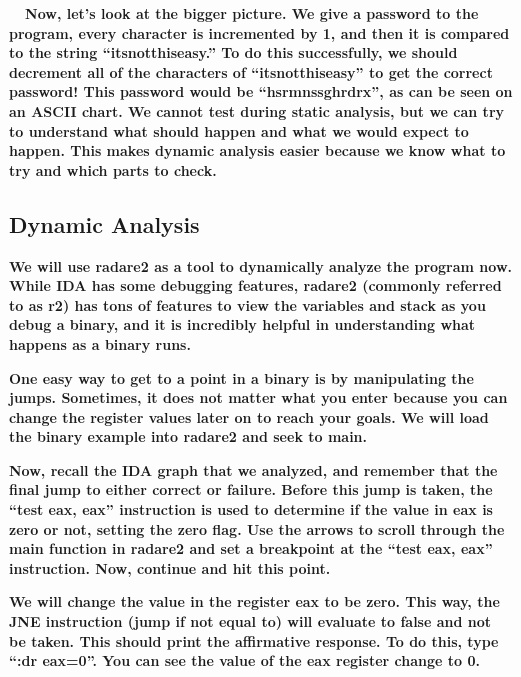 \documentclass[letterpaper]{article}
\newcommand{\sitfig}[3]{
\begin{figure}[H]
\centering
\makebox[\textwidth][c]{
#2
}
\label{#1}
\end{figure}
}
\newcommand{\sitgfx}[4][scale=1.0]{
\sitfig{#3}{\texttt{[image: \#2]}}{#4}
}
\begin{document}
\textbf{ \ \ Now, let's look at the bigger picture. We give a password to the program, every character is incremented by
1, and then it is compared to the string ``itsnotthiseasy.'' To do this successfully, we should decrement all of the
characters of ``itsnotthiseasy'' to get the correct password! This password would be
``hsrmnssghrd{\textasciigrave}rx'', as can be seen on an ASCII chart. We cannot test during static analysis, but we can
try to understand what should happen and what we would expect to happen. This makes dynamic analysis easier because we
know what to try and which parts to check.}

\subsection{Dynamic Analysis}

\textbf{We will use radare2 as a tool to dynamically analyze the program now. While IDA has some debugging features,
radare2 (commonly referred to as r2) has tons of features to view the variables and stack as you debug a binary, and it
is incredibly helpful in understanding what happens as a binary runs.}

\textbf{One easy way to get to a point in a binary is by manipulating the jumps. Sometimes, it does not matter what you
enter because you can change the register values later on to reach your goals. We will load the binary example into
radare2 and seek to main.}

  
\sitgfx[width=6.5in,height=4.0626in]{FINALWORKINGDOCFORMERLYPRECURSOR-img053.png}{fig:unk}{TODO CAPTION}
 \textbf{Now, recall the IDA graph that we analyzed, and remember that the final jump to either correct or failure.
Before this jump is taken, the ``test eax, eax'' instruction is used to determine if the value in eax is zero or not,
setting the zero flag. Use the arrows to scroll through the main function in radare2 and set a breakpoint at the ``test
eax, eax'' instruction. Now, continue and hit this point.}

  
\sitgfx[width=6.5in,height=4.0626in]{FINALWORKINGDOCFORMERLYPRECURSOR-img054.png}{fig:unk}{TODO CAPTION}
 \textbf{We will change the value in the register eax to be zero. This way, the JNE instruction (jump if not equal to)
will evaluate to false and not be taken. This should print the affirmative response. To do this, type ``:dr eax=0''.
You can see the value of the eax register change to 0. }  
\sitgfx[width=6.5in,height=4.0626in]{FINALWORKINGDOCFORMERLYPRECURSOR-img055.png}{fig:unk}{TODO CAPTION}
 
\end{document}
